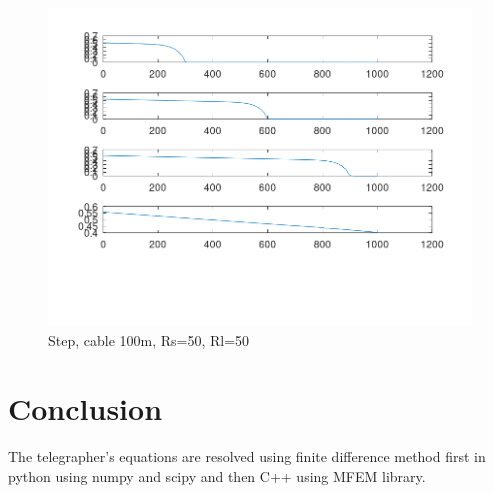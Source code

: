 \documentclass[12pt, letterpaper]{article}
\begin{document}
\begin{figure}[H]
	\centering
	\includegraphics[width=1\textwidth]{step-2_mfem.png} %
	\caption{Step, cable 100m, Rs=50, Rl=50}
\end{figure}

\section{Conclusion}
The telegrapher's equations are resolved using finite difference method first in python using numpy and scipy and then C++ using MFEM library.
\end{document}
